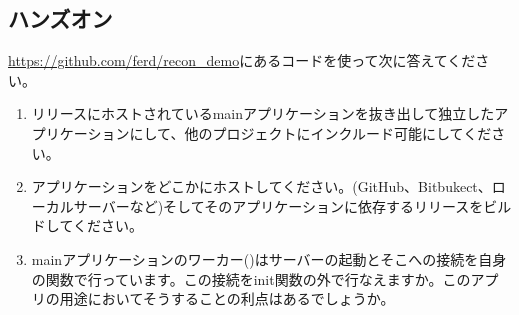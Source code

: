 \subsection*{ハンズオン}

\href{https://github.com/ferd/recon\_demo}{https://github.com/ferd/recon\_demo}にあるコードを使って次に答えてください。

\begin{enumerate}
  \item リリースにホストされているmainアプリケーションを抜き出して独立したアプリケーションにして、他のプロジェクトにインクルード可能にしてください。
  \item アプリケーションをどこかにホストしてください。(GitHub、Bitbukect、ローカルサーバーなど)そしてそのアプリケーションに依存するリリースをビルドしてください。
  \item mainアプリケーションのワーカー()はサーバーの起動とそこへの接続を自身の関数で行っています。この接続をinit関数の外で行なえますか。このアプリの用途においてそうすることの利点はあるでしょうか。 
\end{enumerate}

